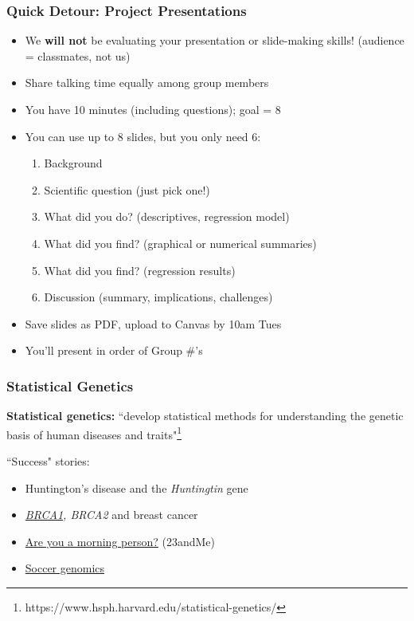 \documentclass[12pt, 
hyperref={colorlinks=true, linkcolor=blue, urlcolor=cyan},dvipsnames]{beamer}
\begin{document}
\begin{frame}
\frametitle{Quick Detour: Project Presentations}

\begin{itemize}
\item We \textbf{will not} be evaluating your presentation or slide-making skills! (audience = classmates, not us)
\item Share talking time equally among group members
\item You have 10 minutes (including questions); goal = 8
\item You can use up to 8 slides, but you only need 6:
	\begin{enumerate}
	\item Background
	\item Scientific question (just pick one!)
	\item What did you do? (descriptives, regression model)
	\item What did you find? (graphical or numerical summaries)
	\item What did you find? (regression results)
	\item Discussion (summary, implications, challenges)
	\end{enumerate}
\item Save slides as PDF, upload to Canvas by 10am Tues
\item You'll present in order of Group \#'s 
\end{itemize}

\end{frame}

\begin{frame}
\frametitle{Statistical Genetics}

\textbf{Statistical genetics:} ``develop statistical methods for understanding the genetic basis of human diseases and traits"\footnote[frame]{https://www.hsph.harvard.edu/statistical-genetics/} \pause

``Success" stories:\vspace{-0.3cm} 
\begin{itemize}
\item Huntington's disease and the \textit{Huntingtin} gene \pause
\item \textit{\href{https://www.nytimes.com/2013/05/14/opinion/my-medical-choice.html}{BRCA1}, BRCA2} and breast cancer \pause
\item \href{https://www.nature.com/articles/ncomms10448}{Are you a morning person?} (23andMe) \pause
\item \href{https://www.soccergenomics.com/}{Soccer genomics}
\end{itemize}
\end{frame}
\end{document}
